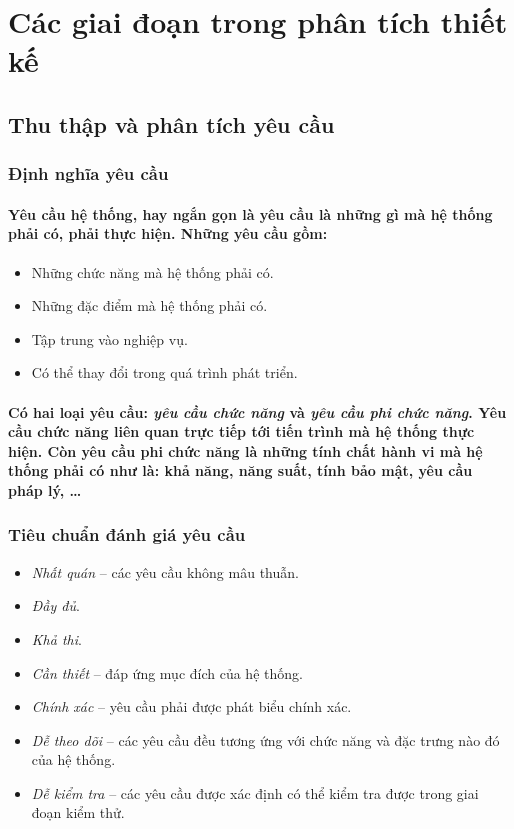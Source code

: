 \documentclass{article}
\begin{document}
\section{Các giai đoạn trong phân tích thiết kế}

  \subsection{Thu thập và phân tích yêu cầu}
  
  \subsubsection{Định nghĩa yêu cầu}
    \paragraph{\textnormal{
      \textbf{Yêu cầu hệ thống}, hay ngắn gọn là \textbf{yêu cầu} là những gì mà hệ thống phải có, phải thực hiện. Những yêu cầu gồm:
    }}
    \begin{itemize}
      \item Những chức năng mà hệ thống phải có.
      \item Những đặc điểm mà hệ thống phải có.
      \item Tập trung vào nghiệp vụ.
      \item Có thể thay đổi trong quá trình phát triển.
    \end{itemize}

    \paragraph{\textnormal{
      Có hai loại yêu cầu: \textit{yêu cầu chức năng} và \textit{yêu cầu phi chức năng}. Yêu cầu chức năng liên quan trực tiếp tới tiến trình mà hệ thống thực hiện. Còn yêu cầu phi chức năng là những tính chất hành vi mà hệ thống phải có như là: khả năng, năng suất, tính bảo mật, yêu cầu pháp lý, \ldots
    }}
  
  \subsubsection{Tiêu chuẩn đánh giá yêu cầu}
    \begin{itemize}
      \item \textit{Nhất quán} -- các yêu cầu không mâu thuẫn.
      \item \textit{Đầy đủ}.
      \item \textit{Khả thi}.
      \item \textit{Cần thiết} -- đáp ứng mục đích của hệ thống.
      \item \textit{Chính xác} -- yêu cầu phải được phát biểu chính xác.
      \item \textit{Dễ theo dõi} -- các yêu cầu đều tương ứng với chức năng và đặc trưng nào đó của hệ thống.
      \item \textit{Dễ kiểm tra} -- các yêu cầu được xác định có thể kiểm tra được trong giai đoạn kiểm thử.
    \end{itemize}
  
\end{document}
